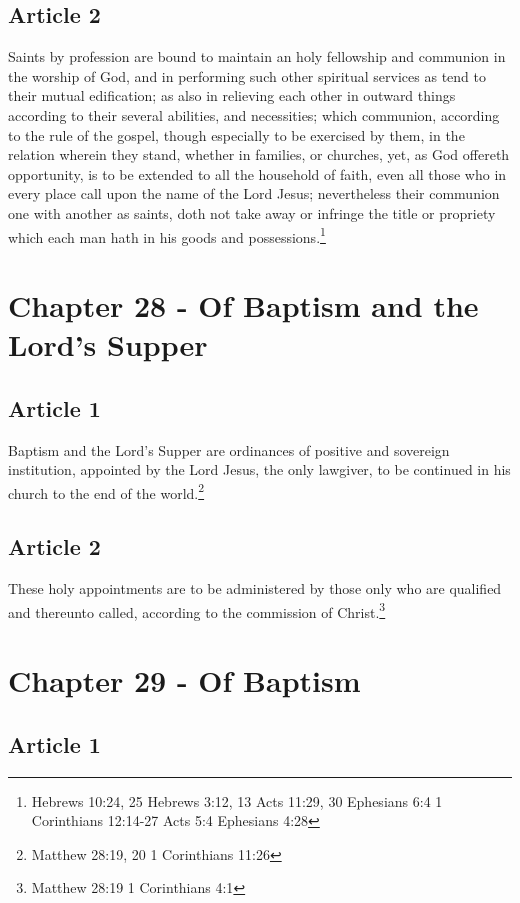 \documentclass[12pt,letterpaper]{book}
\begin{document}
\section{Article 2}

Saints by profession are bound to maintain an holy fellowship and communion in the worship of God, and in performing such other spiritual services as tend to their mutual edification; as also in relieving each other in outward things according to their several abilities, and necessities; which communion, according to the rule of the gospel, though especially to be exercised by them, in the relation wherein they stand, whether in families, or churches, yet, as God offereth opportunity, is to be extended to all the household of faith, even all those who in every place call upon the name of the Lord Jesus; nevertheless their communion one with another as saints, doth not take away or infringe the title or propriety which each man hath in his goods and possessions.\footnote{Hebrews 10:24, 25 Hebrews 3:12, 13 Acts 11:29, 30 Ephesians 6:4 1 Corinthians 12:14-27 Acts 5:4 Ephesians 4:28}

\chapter{Chapter 28 - Of Baptism and the Lord's Supper}
\section{Article 1}

Baptism and the Lord's Supper are ordinances of positive and sovereign institution, appointed by the Lord Jesus, the only lawgiver, to be continued in his church to the end of the world.\footnote{Matthew 28:19, 20 1 Corinthians 11:26}

\section{Article 2}

These holy appointments are to be administered by those only who are qualified and thereunto called, according to the commission of Christ.\footnote{Matthew 28:19 1 Corinthians 4:1}

\chapter{Chapter 29 - Of Baptism}
\section{Article 1}
\end{document}
